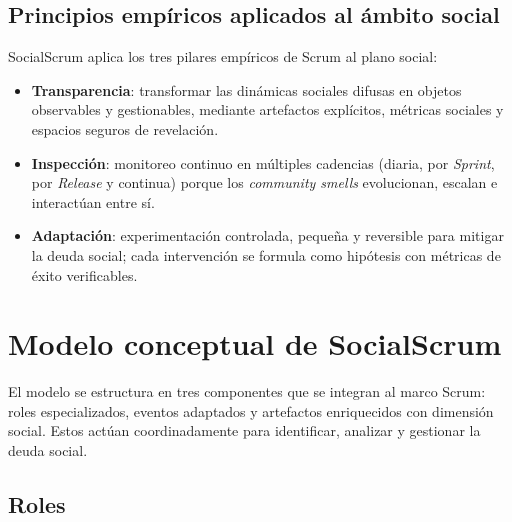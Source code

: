 \subsection{Principios empíricos aplicados al ámbito social}

SocialScrum aplica los tres pilares empíricos de Scrum al plano social:

\begin{itemize}
    \item \textbf{Transparencia}: transformar las dinámicas sociales difusas en objetos observables y gestionables, mediante artefactos explícitos, métricas sociales y espacios seguros de revelación.
    \item \textbf{Inspección}: monitoreo continuo en múltiples cadencias (diaria, por \textit{Sprint}, por \textit{Release} y continua) porque los \textit{community smells} evolucionan, escalan e interactúan entre sí.
    \item \textbf{Adaptación}: experimentación controlada, pequeña y reversible para mitigar la deuda social; cada intervención se formula como hipótesis con métricas de éxito verificables.
\end{itemize}

\section{Modelo conceptual de SocialScrum}

El modelo se estructura en tres componentes que se integran al marco Scrum: roles especializados, eventos adaptados y artefactos enriquecidos con dimensión social. Estos actúan coordinadamente para identificar, analizar y gestionar la deuda social.

\subsection{Roles}

